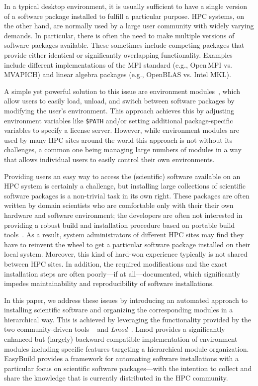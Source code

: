 In a typical desktop environment, it is usually sufficient to have a
single version of a software package installed to fulfill a particular purpose. HPC
systems, on the other hand, are normally used by a large user community with widely varying
demands. In particular, there is often the need to make multiple versions of
software packages available. These sometimes include competing packages
that provide either identical or significantly overlapping functionality. Examples include
 different implementations of the MPI standard (e.g., Open\,MPI vs.
MVAPICH) and linear algebra packages (e.g., OpenBLAS vs. Intel MKL).

A simple yet powerful solution to this issue are environment
modules~\cite{furlani91,furlani96,eadline,laytonEM1}, which allow
users to easily load, unload, and switch between software packages by
modifying the user's environment. This approach achieves this by adjusting environment
variables like \texttt{\small\$PATH} and/or setting additional package-specific
variables to specify a license server.
However, while environment modules are used by many
HPC sites around the world this approach is not without its challenges,
a common one being managing large numbers of modules in a way that allows individual
users to easily control their own environments.

Providing users an easy way to access the (scientific) software
available on an HPC system is certainly a challenge, but installing large collections
of scientific software packages is a
non-trivial task in its own right. These packages are often written by domain
scientists who are comfortable only with their their own hardware and software
environment; the developers are often not interested in providing a robust
build and installation procedure based on portable build
tools~\cite{Dubois03}. As a result, system administrators of different HPC sites may
find they have to reinvent the wheel to
get a particular software package installed on their local system. Moreover, this
kind of hard-won experience typically is not shared between HPC sites. In
addition, the required modifications and the exact installation steps are
often poorly---if at all---documented, which significantly impedes
maintainability and reproducibility of software installations.

In this paper, we address these issues by introducing an automated approach to
installing scientific software and organizing the corresponding modules in a
hierarchical way. This is achieved by leveraging the functionality provided by the
two community-driven tools \emph{\easybuild{}}~\cite{EasyBuildSC12} and
\emph{Lmod}~\cite{taccLmod}. Lmod provides a significantly enhanced but
(largely) backward-compatible implementation of environment modules including specific
features targeting a hierarchical module organization. EasyBuild provides a
framework for automating software installations with a particular focus on
scientific software packages---with the intention to collect and share the
knowledge that is currently distributed in the HPC community.

